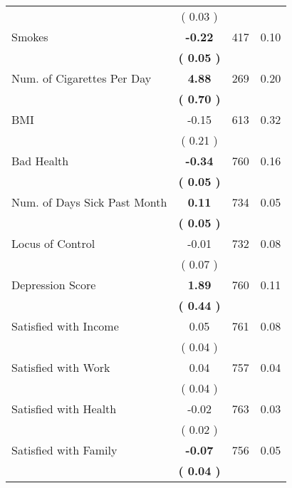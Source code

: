 \begin{tabular}{lccc}
 & (     0.03 ) & \\
Smokes & \textbf{    -0.22} & 417 &      0.10 \\ 
 & \textbf{(     0.05 )} & \\
Num. of Cigarettes Per Day & \textbf{     4.88} & 269 &      0.20 \\ 
 & \textbf{(     0.70 )} & \\
BMI &     -0.15 & 613 &      0.32 \\ 
 & (     0.21 ) & \\
Bad Health & \textbf{    -0.34} & 760 &      0.16 \\ 
 & \textbf{(     0.05 )} & \\
Num. of Days Sick Past Month & \textbf{     0.11} & 734 &      0.05 \\ 
 & \textbf{(     0.05 )} & \\
Locus of Control &     -0.01 & 732 &      0.08 \\ 
 & (     0.07 ) & \\
Depression Score & \textbf{     1.89} & 760 &      0.11 \\ 
 & \textbf{(     0.44 )} & \\
Satisfied with Income &      0.05 & 761 &      0.08 \\ 
 & (     0.04 ) & \\
Satisfied with Work &      0.04 & 757 &      0.04 \\ 
 & (     0.04 ) & \\
Satisfied with Health &     -0.02 & 763 &      0.03 \\ 
 & (     0.02 ) & \\
Satisfied with Family & \textbf{    -0.07} & 756 &      0.05 \\ 
 & \textbf{(     0.04 )} & \\
\bottomrule
\end{tabular}
